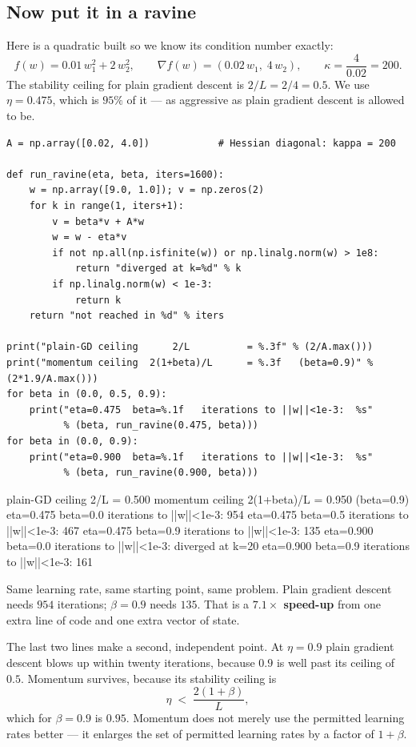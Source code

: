 \documentclass[11pt]{article}
\begin{document}
\subsection{Now put it in a ravine}

Here is a quadratic built so we know its condition number exactly:
\[
  f(w) = 0.01\,w_1^2 + 2\,w_2^2,
  \qquad \nabla f(w) = (0.02\,w_1,\; 4\,w_2),
  \qquad \kappa = \frac{4}{0.02} = 200 .
\]
The stability ceiling for plain gradient descent is $2/L = 2/4 = 0.5$. We use
$\eta = 0.475$, which is $95\%$ of it --- as aggressive as plain gradient
descent is allowed to be.

\begin{lstlisting}
A = np.array([0.02, 4.0])            # Hessian diagonal: kappa = 200

def run_ravine(eta, beta, iters=1600):
    w = np.array([9.0, 1.0]); v = np.zeros(2)
    for k in range(1, iters+1):
        v = beta*v + A*w
        w = w - eta*v
        if not np.all(np.isfinite(w)) or np.linalg.norm(w) > 1e8:
            return "diverged at k=%d" % k
        if np.linalg.norm(w) < 1e-3:
            return k
    return "not reached in %d" % iters

print("plain-GD ceiling      2/L          = %.3f" % (2/A.max()))
print("momentum ceiling  2(1+beta)/L      = %.3f   (beta=0.9)" % (2*1.9/A.max()))
for beta in (0.0, 0.5, 0.9):
    print("eta=0.475  beta=%.1f   iterations to ||w||<1e-3:  %s"
          % (beta, run_ravine(0.475, beta)))
for beta in (0.0, 0.9):
    print("eta=0.900  beta=%.1f   iterations to ||w||<1e-3:  %s"
          % (beta, run_ravine(0.900, beta)))
\end{lstlisting}
\begin{codeout}
plain-GD ceiling      2/L          = 0.500
momentum ceiling  2(1+beta)/L      = 0.950   (beta=0.9)
eta=0.475  beta=0.0   iterations to ||w||<1e-3:  954
eta=0.475  beta=0.5   iterations to ||w||<1e-3:  467
eta=0.475  beta=0.9   iterations to ||w||<1e-3:  135
eta=0.900  beta=0.0   iterations to ||w||<1e-3:  diverged at k=20
eta=0.900  beta=0.9   iterations to ||w||<1e-3:  161
\end{codeout}

Same learning rate, same starting point, same problem. Plain gradient descent
needs $954$ iterations; $\beta = 0.9$ needs $135$. That is a
\textbf{$7.1\times$ speed-up} from one extra line of code and one extra vector
of state.

The last two lines make a second, independent point. At $\eta = 0.9$ plain
gradient descent blows up within twenty iterations, because $0.9$ is well past
its ceiling of $0.5$. Momentum survives, because its stability ceiling is
\begin{equation}
  \label{eq:momstab}
  \eta \;<\; \frac{2(1+\beta)}{L},
\end{equation}
which for $\beta = 0.9$ is $0.95$. Momentum does not merely use the permitted
learning rates better --- it enlarges the set of permitted learning rates by a
factor of $1+\beta$.
\end{document}

